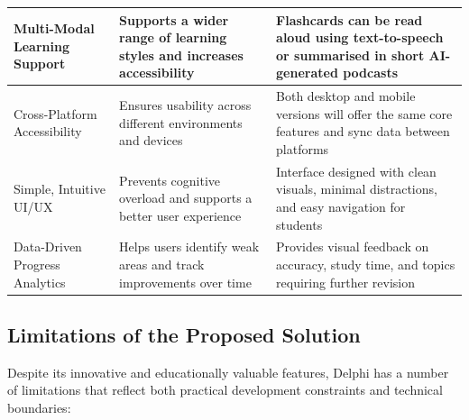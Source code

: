 \documentclass[a4paper,12pt]{article}
\begin{document}
\begin{ThreePartTable}
\begin{longtable}{|>{\raggedright\arraybackslash}p{3.5cm}|>{\raggedright\arraybackslash}p{5.5cm}|>{\raggedright\arraybackslash}p{5.5cm}|}
Multi-Modal Learning Support & Supports a wider range of learning styles and increases accessibility & Flashcards can be read aloud using text-to-speech or summarised in short AI-generated podcasts \\
\hline

Cross-Platform Accessibility & Ensures usability across different environments and devices & Both desktop and mobile versions will offer the same core features and sync data between platforms \\
\hline

Simple, Intuitive UI/UX & Prevents cognitive overload and supports a better user experience & Interface designed with clean visuals, minimal distractions, and easy navigation for students \\
\hline

Data-Driven Progress Analytics & Helps users identify weak areas and track improvements over time & Provides visual feedback on accuracy, study time, and topics requiring further revision \\
\hline

\end{longtable}
\end{ThreePartTable}

\newpage

\subsection{Limitations of the Proposed Solution}

Despite its innovative and educationally valuable features, Delphi has a number of limitations that reflect both practical development constraints and technical boundaries:
\end{document}
